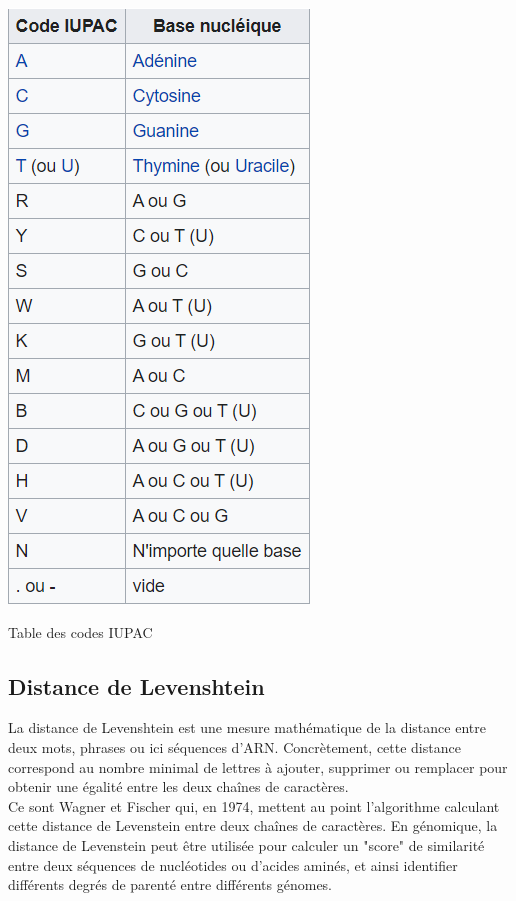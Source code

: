 \documentclass[12pt]{article}
\begin{document}
        \begin{table} [!h]
             \centering
             \includegraphics[scale = 1]{Images/Codons/nucleotides.png}
             \caption{Table des  codes IUPAC}
             \label{fig:table des codes IUPAC}
        \end{table}
        
\newpage

\subsection{Distance de Levenshtein} 



La distance de Levenshtein est une mesure mathématique de la distance entre deux mots, phrases ou ici séquences d'ARN. Concrètement, cette distance correspond au nombre minimal de lettres à ajouter, supprimer ou remplacer pour obtenir une égalité entre les deux chaînes de caractères.\\
Ce sont Wagner et Fischer qui, en 1974, mettent au point l'algorithme calculant cette distance de Levenstein entre deux chaînes de caractères. 
En génomique, la distance de Levenstein peut être utilisée pour calculer un "score" de similarité entre deux séquences de nucléotides ou d'acides aminés, et ainsi identifier différents degrés de parenté entre différents génomes.\\
\end{document}

